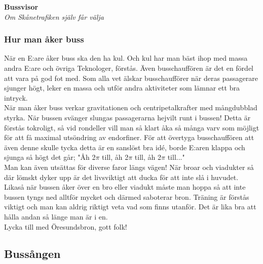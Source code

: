 \begin{center}
    \vspace*{1.5cm}
    {\fontsize{20}{20}\textbf{Bussvisor}}\\
    \vspace{0.7cm}
    {\fontsize{12}{12}\textit{Om Skånetrafiken själv får välja}}
\end{center}
\noBackground

\newpage
\resetBackground


\subsubsection*{Hur man åker buss}
När en E:are åker buss ska den ha kul. Och kul har man bäst ihop med 
massa andra E:are och övriga Teknologer, förstås. Även busschauffören 
är det en fördel att vara på god fot med. Som alla vet älskar busschaufförer 
när deras passagerare sjunger högt, leker en massa och utför andra aktiviteter 
som lämnar ett bra intryck.
\\

När man åker buss verkar gravitationen och centripetalkrafter med 
mångdubblad styrka. När bussen svänger slungas passagerarna hejvilt 
runt i bussen! Detta är förstås tokroligt, så vid rondeller vill man 
så klart åka så många varv som möjligt för att få maximal utsöndring 
av endorfiner. För att övertyga busschauffören att även denne skulle 
tycka detta är en sanslöst bra idé, borde E:aren klappa och sjunga så 
högt det går; "Åh 2$\pi$ till, åh 2$\pi$ till, åh 2$\pi$ till..."
\\

Man kan även utsättas för diverse faror längs vägen! När broar 
och viadukter så där lömskt dyker upp är det livsviktigt att ducka 
för att inte slå i huvudet. Likaså när bussen åker över en bro eller 
viadukt måste man hoppa så att inte bussen tyngs ned alltför mycket 
och därmed saboterar bron. Träning är förstås viktigt och man kan 
aldrig riktigt veta vad som finns utanför. Det är lika bra att hålla 
andan så länge man är i en.
\\

Lycka till med Öresundsbron, gott folk!

\newpage

\subsection*{Bussången} 

